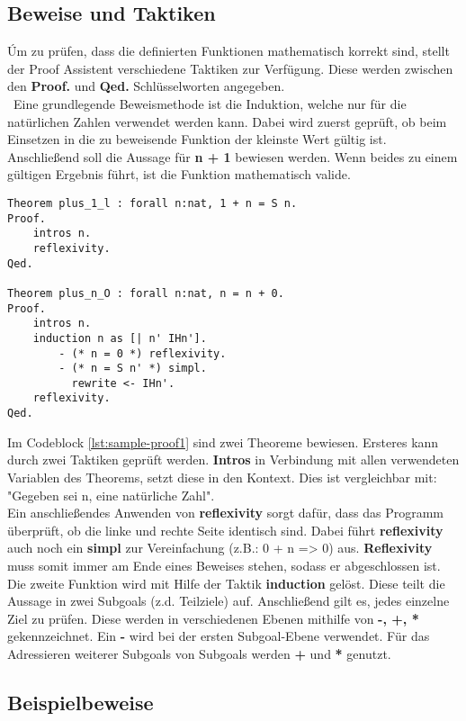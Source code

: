 \subsection{Beweise und Taktiken}
Úm zu prüfen, dass die definierten Funktionen mathematisch korrekt sind, stellt der Proof Assistent verschiedene Taktiken zur Verfügung. Diese werden zwischen den \textbf{Proof.} und \textbf{Qed.} Schlüsselworten angegeben.\\\
Eine grundlegende Beweismethode ist die Induktion, welche nur für die natürlichen Zahlen verwendet werden kann. Dabei wird zuerst geprüft, ob beim Einsetzen in die zu beweisende Funktion der kleinste Wert gültig ist. Anschließend soll die Aussage für \textbf{n + 1} bewiesen werden. Wenn beides zu einem gültigen Ergebnis führt, ist die Funktion mathematisch valide.
\begin{lstlisting}[language=coq,firstnumber=1,caption=Coq Beispielbeweis,label=lst:sample-proof1]
Theorem plus_1_l : forall n:nat, 1 + n = S n.
Proof.
	intros n. 
	reflexivity. 
Qed.

Theorem plus_n_O : forall n:nat, n = n + 0.
Proof.
	intros n. 
	induction n as [| n' IHn'].
		- (* n = 0 *) reflexivity.
		- (* n = S n' *) simpl.
		  rewrite <- IHn'.
	reflexivity.
Qed.
\end{lstlisting}
Im Codeblock \ref{lst:sample-proof1} sind zwei Theoreme bewiesen. Ersteres kann durch zwei Taktiken geprüft werden. \textbf{Intros} in Verbindung mit allen verwendeten Variablen des Theorems, setzt diese in den Kontext. Dies ist vergleichbar mit: "Gegeben sei n, eine natürliche Zahl".\\
Ein anschließendes Anwenden von \textbf{reflexivity} sorgt dafür, dass das Programm überprüft, ob die linke und rechte Seite identisch sind. Dabei führt \textbf{reflexivity} auch noch ein \textbf{simpl} zur Vereinfachung (z.B.: 0 + n => 0) aus. \textbf{Reflexivity} muss somit immer am Ende eines Beweises stehen, sodass er abgeschlossen ist.\\
Die zweite Funktion wird mit Hilfe der Taktik \textbf{induction} gelöst. Diese teilt die Aussage in zwei Subgoals (z.d. Teilziele) auf. Anschließend gilt es, jedes einzelne Ziel zu prüfen. Diese werden in verschiedenen Ebenen mithilfe von \textbf{-, +, *} gekennzeichnet. Ein \textbf{-} wird bei der ersten Subgoal-Ebene verwendet. Für das Adressieren weiterer Subgoals von Subgoals werden \textbf{+} und \textbf{*} genutzt.
\subsection{Beispielbeweise}

